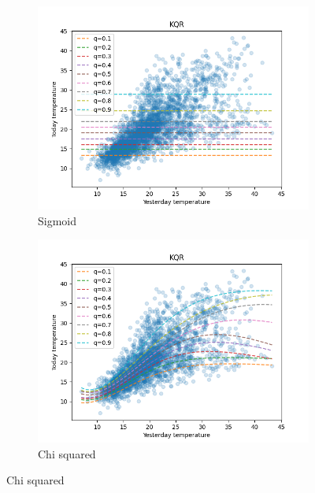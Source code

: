 \begin{figure}[!h]\ContinuedFloat
    \begin{subfigure}[b]{0.5\linewidth}
        \centering
        \includegraphics[width=1.1\textwidth]{images/melborune_sigmoid_kernel_quantile_regression.png}
        \caption{Sigmoid} 
        \label{} 
        \vspace{4ex}
    \end{subfigure} 
    \begin{subfigure}[b]{0.5\linewidth}
        \centering
        \includegraphics[width=1.1\textwidth]{images/melborune_chi_squared_kernel_quantile_regression.png}
        \caption{Chi squared} 
        \label{} 
        \vspace{4ex}
    \end{subfigure}


\end{figure}
